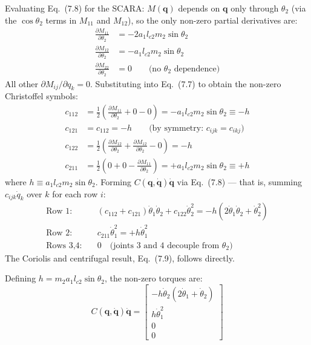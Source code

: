 \documentclass{article}
\begin{document}
Evaluating Eq.~(7.8) for the SCARA: $M(\mathbf{q})$ depends on $\mathbf{q}$ only through $\theta_2$ (via the $\cos\theta_2$ terms in $M_{11}$ and $M_{12}$), so the only non-zero partial derivatives are:
\begin{align*}
\frac{\partial M_{11}}{\partial \theta_2} &= -2a_1 l_{c2} m_2 \sin\theta_2 \\
\frac{\partial M_{12}}{\partial \theta_2} &= -a_1 l_{c2} m_2 \sin\theta_2 \\
\frac{\partial M_{22}}{\partial \theta_2} &= 0 \qquad \text{(no } \theta_2 \text{ dependence)}
\end{align*}
All other $\partial M_{ij}/\partial q_k = 0$. Substituting into Eq.~(7.7) to obtain the non-zero Christoffel symbols:
\begin{align*}
c_{112} &= \tfrac{1}{2}\left(\frac{\partial M_{11}}{\partial \theta_2} + 0 - 0\right) = -a_1 l_{c2} m_2 \sin\theta_2 \equiv -h \\
c_{121} &= c_{112} = -h \qquad \text{(by symmetry: } c_{ijk} = c_{ikj}\text{)} \\
c_{122} &= \tfrac{1}{2}\left(\frac{\partial M_{12}}{\partial \theta_2} + \frac{\partial M_{12}}{\partial \theta_2} - 0\right) = -h \\
c_{211} &= \tfrac{1}{2}\left(0 + 0 - \frac{\partial M_{11}}{\partial \theta_2}\right) = +a_1 l_{c2} m_2 \sin\theta_2 \equiv +h
\end{align*}
where $h \equiv a_1 l_{c2} m_2 \sin\theta_2$. Forming $C(\mathbf{q},\dot{\mathbf{q}})\dot{\mathbf{q}}$ via Eq.~(7.8) --- that is, summing $c_{ijk}\dot{q}_k$ over $k$ for each row $i$:
\begin{align*}
\text{Row 1:} \quad & (c_{112}+c_{121})\dot{\theta}_1\dot{\theta}_2 + c_{122}\dot{\theta}_2^2 = -h\!\left(2\dot{\theta}_1\dot{\theta}_2 + \dot{\theta}_2^2\right) \\
\text{Row 2:} \quad & c_{211}\dot{\theta}_1^2 = +h\dot{\theta}_1^2 \\
\text{Rows 3,4:} \quad & 0 \quad \text{(joints 3 and 4 decouple from } \theta_2\text{)}
\end{align*}
The Coriolis and centrifugal result, Eq.~(7.9), follows directly.


Defining $h = m_2 a_1 l_{c2} \sin\theta_2$, the non-zero torques are:
\begin{equation}
C(\mathbf{q}, \dot{\mathbf{q}})\dot{\mathbf{q}} = \begin{bmatrix}
-h\dot{\theta}_2(2\dot{\theta}_1 + \dot{\theta}_2) \\
h\dot{\theta}_1^2 \\
0 \\
0
\end{bmatrix} \tag{7.9}
\end{equation}
\end{document}
